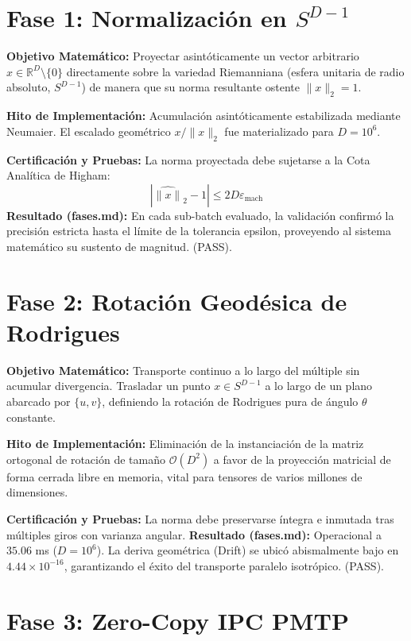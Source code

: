 \section{Fase 1: Normalización en $S^{D-1}$}

\textbf{Objetivo Matemático:} Proyectar asintóticamente un vector arbitrario $x \in \mathbb{R}^D \setminus \{0\}$ directamente sobre la variedad Riemanniana (esfera unitaria de radio absoluto, $S^{D-1}$) de manera que su norma resultante ostente $\lVert x \rVert_2 = 1$.

\textbf{Hito de Implementación:} Acumulación asintóticamente estabilizada mediante Neumaier. El escalado geométrico $x / \lVert x \rVert_2$ fue materializado para $D = 10^6$.

\textbf{Certificación y Pruebas:} La norma proyectada debe sujetarse a la Cota Analítica de Higham:
\begin{equation}
| \widehat{\lVert x \rVert}_2 - 1 | \le 2D \varepsilon_{\text{mach}}
\end{equation}
\textbf{Resultado (fases.md):} En cada sub-batch evaluado, la validación confirmó la precisión estricta hasta el límite de la tolerancia epsilon, proveyendo al sistema matemático su sustento de magnitud. (PASS).

\section{Fase 2: Rotación Geodésica de Rodrigues}

\textbf{Objetivo Matemático:} Transporte continuo a lo largo del múltiple sin acumular divergencia. Trasladar un punto $x \in S^{D-1}$ a lo largo de un plano abarcado por $\{u, v\}$, definiendo la rotación de Rodrigues pura de ángulo $\theta$ constante.

\textbf{Hito de Implementación:} Eliminación de la instanciación de la matriz ortogonal de rotación de tamaño $\mathcal{O}(D^2)$ a favor de la proyección matricial de forma cerrada libre en memoria, vital para tensores de varios millones de dimensiones.

\textbf{Certificación y Pruebas:} La norma debe preservarse íntegra e inmutada tras múltiples giros con varianza angular.
\textbf{Resultado (fases.md):} Operacional a $35.06$ ms ($D=10^6$). La deriva geométrica (Drift) se ubicó abismalmente bajo en $4.44 \times 10^{-16}$, garantizando el éxito del transporte paralelo isotrópico. (PASS).

\section{Fase 3: Zero-Copy IPC PMTP}

